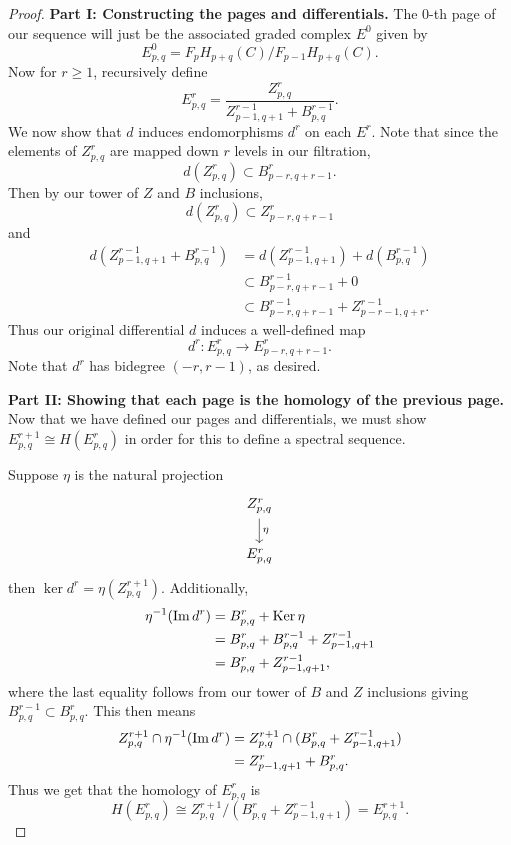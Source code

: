 \documentclass[twoside,10pt]{article}
\begin{document}
\begin{proof}
\textbf{Part I: Constructing the pages and differentials.} The 0-th page of our sequence will just be the associated graded complex $E^{0}$ given by
\[
	E^{0}_{p,q} = F_{p}H_{p+q}(C) / F_{p-1}H_{p+q}(C).
\] 
Now for $r \geq 1$, recursively define
\[
	E^{r}_{p,q} = \frac{Z^{r}_{p,q}}{ Z^{r-1}_{p-1,q+1}+B_{p,q}^{r-1} }.
\] 
We now show that $d$ induces endomorphisms $d^{r}$ on each $E^{r}$. Note that since the elements of $Z^{r}_{p,q}$ are mapped down $r$ levels in our filtration,
\[
	d(Z^{r}_{p,q}) \subset B_{p-r,q+r-1}^{r}.
\] Then by our tower of $Z$ and $B$ inclusions,
\[
	d(Z^{r}_{p,q}) \subset Z_{p-r,q+r-1}^{r}
\] and
\begin{align*}
	d(Z_{p-1,q+1}^{r-1}+B_{p,q}^{r-1}) &= d(Z_{p-1,q+1}^{r-1}) + d(B_{p,q}^{r-1}) \\
				       &\subset B_{p-r,q+r-1}^{r-1} + 0 \\
				       &\subset B^{r-1}_{p-r,q+r-1} + Z_{p-r-1,q+r}^{r-1}.
\end{align*}
Thus our original differential $d$ induces a well-defined map
\[
	d^{r}: E^{r}_{p,q} \to E_{p-r,q+r-1}^{r}.
\] 
Note that $d^{r}$ has bidegree $(-r,r-1)$, as desired.

\textbf{Part II: Showing that each page is the homology of the previous page.} Now that we have defined our pages and differentials, we must show $E_{p,q}^{r+1}\cong  H(E_{p,q}^{r})$ in order for this to define a spectral sequence.

Suppose $\eta$ is the natural projection
\[
\begin{tikzcd}
	Z_{p,q}^{r}\dar{\eta}\\E_{p,q}^{r}
\end{tikzcd}
\] then $\ker d^{r} = \eta(Z_{p,q}^{r+1})$. Additionally,
\begin{align*}
	\eta^{-1}(\operatorname{Im} d^{r}) &= B_{p,q}^{r}+\operatorname{Ker} \eta\\
			     &= B_{p,q}^{r}+B_{p,q}^{r-1}+Z_{p-1,q+1}^{r-1}\\
			     &= B_{p,q}^{r}+Z_{p-1,q+1}^{r-1},
\end{align*}
where the last equality follows from our tower of $B$ and $Z$ inclusions giving $B_{p,q}^{r-1} \subset B_{p,q}^{r}$. This then means
\begin{align*}
	Z_{p,q}^{r+1}\cap \eta^{-1}(\operatorname{Im} d^{r}) &= Z_{p,q}^{r+1} \cap (B_{p,q}^{r}+Z_{p-1,q+1}^{r-1}) \\
						   &= Z_{p-1,q+1}^{r}+B_{p,q}^{r}.
\end{align*}
Thus we get that the homology of $E_{p,q}^{r}$ is
\[
	H(E_{p,q}^{r}) \cong Z_{p,q}^{r+1} / \left( B_{p,q}^{r}+Z_{p-1,q+1}^{r-1} \right) = E_{p,q}^{r+1}.
\] 


\end{proof}
\end{document}
